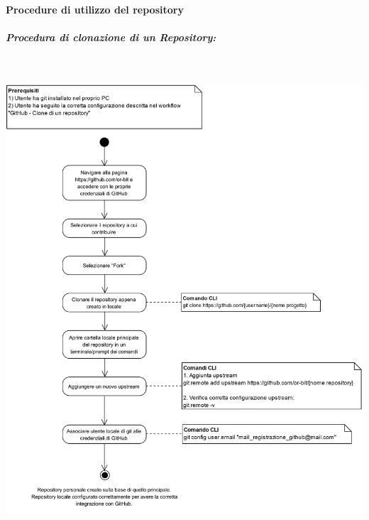 \paragraph{Procedure di utilizzo del repository}\mbox{}

\begin{samepage}
	\subparagraph{Procedura di clonazione di un Repository:}\mbox{}\\	
	\begin{center}
		\includegraphics[width=15cm]{../../documenti/NormeDiProgetto/DiagrammiProcedure/GitHub-CloneDiUnRepository.png}
	\end{center}
\end{samepage}

